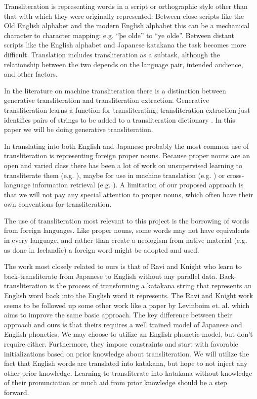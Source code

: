 \documentclass{article}
\begin{document}
Transliteration is representing words
in a script or orthographic style
other than that with which they were originally represented.
Between close scripts like the Old English alphabet and the modern English alphabet
this can be a mechanical character to character mapping:
e.g. ``þe olde'' to ``ye olde''.
Between distant scripts
like the English alphabet and Japanese katakana
the task becomes more difficult.
Translation includes transliteration as a subtask,
although the relationship between the two
depends on the language pair, intended audience, and other factors.

In the literature on machine transliteration there is a distinction
between generative transliteration and transliteration extraction.
Generative transliteration learns a function for transliterating;
transliteration extraction just identifies pairs of strings
to be added to a transliteration dictionary
\cite{Karimi:2011:MTS:1922649.1922654}.
In this paper we will be doing generative transliteration.

In translating into both English and Japanese
probably the most common use of transliteration
is representing foreign proper nouns.
Because proper nouns are an open and varied class
there has been a lot of work on unsupervised learning to transliterate them
(e.g. \cite{Tao2006UnsupervisedNE}),
maybe for use in machine translation (e.g. \cite{Durrani2014IntegratingAU})
or cross-language information retrieval (e.g. \cite{10.1007/978-3-642-40087-2_29}).
A limitation of our proposed approach
is that we will not pay any special attention to proper nouns,
which often have their own conventions for transliteration.

The use of transliteration most relevant to this project
is the borrowing of words from foreign languages.
Like proper nouns,
some words may not have equivalents in every language,
and rather than create a neologism from native material (e.g. as done in Icelandic)
a foreign word might be adopted and used.

The work most closely related to ours is that of Ravi and Knight
\cite{Ravi2009LearningPM}
who learn to back-transliterate from Japanese to English
without any parallel data.
Back-transliteration is the process of
transforming a katakana string that represents an English word
back into the English word it represents.
The Ravi and Knight work seems to be followed up some other work
like a paper by Levinboim et. al. \cite{Levinboim2015ModelIR}
which aims to improve the same basic approach.
The key difference between their approach and ours
is that theirs requires a well trained model of Japanese and English phonetics.
We may choose to utilize an English phonetic model,
but don't require either.
Furthermore,
they impose constraints and start with favorable initializations
based on prior knowledge about transliteration.
We will utilize the fact
that English words are translated into katakana,
but hope to not inject any other prior knowledge.
Learning to transliterate into katakana
without knowledge of their pronunciation
or much aid from prior knowledge should be a step forward.
\end{document}
